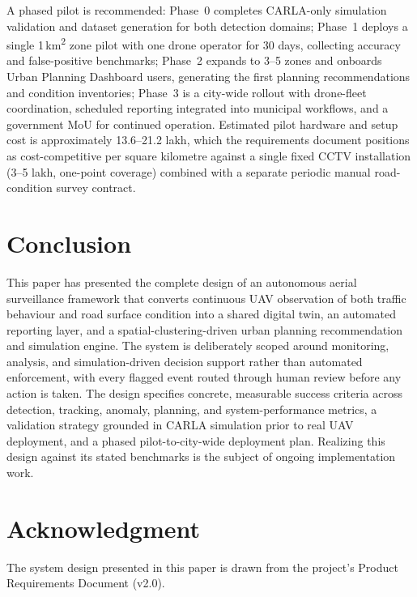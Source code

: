 \documentclass[conference]{IEEEtran}
\begin{document}
A phased pilot is recommended: Phase~0 completes CARLA-only simulation validation and dataset generation for both detection domains; Phase~1 deploys a single 1\,km\textsuperscript{2} zone pilot with one drone operator for 30 days, collecting accuracy and false-positive benchmarks; Phase~2 expands to 3--5 zones and onboards Urban Planning Dashboard users, generating the first planning recommendations and condition inventories; Phase~3 is a city-wide rollout with drone-fleet coordination, scheduled reporting integrated into municipal workflows, and a government MoU for continued operation. Estimated pilot hardware and setup cost is approximately \textrm{\textrupee}13.6--21.2 lakh, which the requirements document positions as cost-competitive per square kilometre against a single fixed CCTV installation (\textrm{\textrupee}3--5 lakh, one-point coverage) combined with a separate periodic manual road-condition survey contract.

\section{Conclusion}
\label{sec:conclusion}

This paper has presented the complete design of an autonomous aerial surveillance framework that converts continuous UAV observation of both traffic behaviour and road surface condition into a shared digital twin, an automated reporting layer, and a spatial-clustering-driven urban planning recommendation and simulation engine. The system is deliberately scoped around monitoring, analysis, and simulation-driven decision support rather than automated enforcement, with every flagged event routed through human review before any action is taken. The design specifies concrete, measurable success criteria across detection, tracking, anomaly, planning, and system-performance metrics, a validation strategy grounded in CARLA simulation prior to real UAV deployment, and a phased pilot-to-city-wide deployment plan. Realizing this design against its stated benchmarks is the subject of ongoing implementation work.

\section*{Acknowledgment}
The system design presented in this paper is drawn from the project's Product Requirements Document (v2.0).
\end{document}
